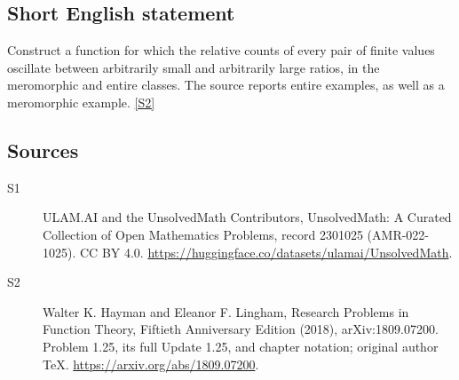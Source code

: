 \documentclass[11pt]{article}
\newcommand{\sref}[2]{\hyperlink{source:#1:#2}{[S#2]}}
\begin{document}
\subsection{Short English statement}
Construct a function for which the relative counts of every pair of finite values oscillate between arbitrarily small and arbitrarily large ratios, in the meromorphic and entire classes. The source reports entire examples, as well as a meromorphic example. \sref{2301025}{2}
\subsection{Sources}
\begin{description}
\item[\hypertarget{source:2301025:1}{S1}] ULAM.AI and the UnsolvedMath Contributors, UnsolvedMath: A Curated Collection of Open Mathematics Problems, record 2301025 (AMR-022-1025). CC BY 4.0. \url{https://huggingface.co/datasets/ulamai/UnsolvedMath}.
\item[\hypertarget{source:2301025:2}{S2}] Walter K. Hayman and Eleanor F. Lingham, Research Problems in Function Theory, Fiftieth Anniversary Edition (2018), arXiv:1809.07200. Problem 1.25, its full Update 1.25, and chapter notation; original author TeX. \url{https://arxiv.org/abs/1809.07200}.
\end{description}
\label{end:2301025}
\end{document}
